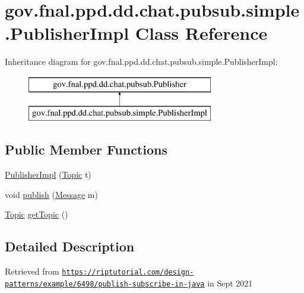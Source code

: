 \hypertarget{classgov_1_1fnal_1_1ppd_1_1dd_1_1chat_1_1pubsub_1_1simple_1_1PublisherImpl}{\section{gov.\-fnal.\-ppd.\-dd.\-chat.\-pubsub.\-simple.\-Publisher\-Impl Class Reference}
\label{classgov_1_1fnal_1_1ppd_1_1dd_1_1chat_1_1pubsub_1_1simple_1_1PublisherImpl}
}
Inheritance diagram for gov.\-fnal.\-ppd.\-dd.\-chat.\-pubsub.\-simple.\-Publisher\-Impl\-:\begin{figure}[H]
\begin{center}
\leavevmode
\includegraphics[height=2.000000cm]{classgov_1_1fnal_1_1ppd_1_1dd_1_1chat_1_1pubsub_1_1simple_1_1PublisherImpl}
\end{center}
\end{figure}
\subsection*{Public Member Functions}
\begin{DoxyCompactItemize}
\item 
\hyperlink{classgov_1_1fnal_1_1ppd_1_1dd_1_1chat_1_1pubsub_1_1simple_1_1PublisherImpl_a668cc6930bdbe003da93e33de1a1febb}{Publisher\-Impl} (\hyperlink{classgov_1_1fnal_1_1ppd_1_1dd_1_1chat_1_1pubsub_1_1Topic}{Topic} t)
\item 
void \hyperlink{classgov_1_1fnal_1_1ppd_1_1dd_1_1chat_1_1pubsub_1_1simple_1_1PublisherImpl_a0f1bd92c6c0a4768252010e72a4ce718}{publish} (\hyperlink{interfacegov_1_1fnal_1_1ppd_1_1dd_1_1chat_1_1pubsub_1_1Message}{Message} m)
\item 
\hyperlink{classgov_1_1fnal_1_1ppd_1_1dd_1_1chat_1_1pubsub_1_1Topic}{Topic} \hyperlink{classgov_1_1fnal_1_1ppd_1_1dd_1_1chat_1_1pubsub_1_1simple_1_1PublisherImpl_a98306eea0af71dfe02686899d12f537e}{get\-Topic} ()
\end{DoxyCompactItemize}


\subsection{Detailed Description}
Retrieved from \href{https://riptutorial.com/design-patterns/example/6498/publish-subscribe-in-java}{\tt https\-://riptutorial.\-com/design-\/patterns/example/6498/publish-\/subscribe-\/in-\/java} in Sept 2021

